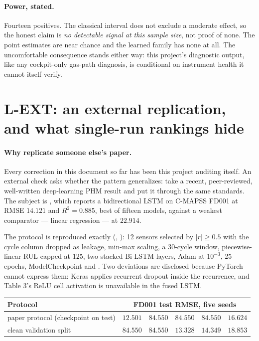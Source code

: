 \paragraph{Power, stated.} Fourteen positives. The classical interval does not exclude a
moderate effect, so the honest claim is \emph{no detectable signal at this sample size}, not
proof of none. The point estimates are near chance and the learned family has none at all. The
uncomfortable consequence stands either way: this project's diagnostic output, like any
cockpit-only gas-path diagnosis, is conditional on instrument health it cannot itself verify.

\section{L-EXT: an external replication, and what single-run rankings hide}
\label{sec:f14-ext}

\paragraph{Why replicate someone else's paper.} Every correction in this document so far has
been this project auditing itself. An external check asks whether the pattern generalizes:
take a recent, peer-reviewed, well-written deep-learning PHM result and put it through the same
standards. The subject is \textcite{mukherjee2026bilstm}, which reports a bidirectional LSTM on
C-MAPSS FD001 at RMSE $14.121$ and $R^2 = 0.885$, best of fifteen models, against a weakest
comparator --- linear regression --- at $22.914$.

The protocol is reproduced exactly (,
): 12 sensors selected by $|r| \ge 0.5$ with the cycle column dropped as
leakage, min-max scaling, a 30-cycle window, piecewise-linear RUL capped at 125, two stacked
Bi-LSTM layers, Adam at $10^{-3}$, 25 epochs, ModelCheckpoint and
. Two deviations are disclosed because PyTorch cannot
express them: Keras applies recurrent dropout inside the recurrence, and Table 3's ReLU cell
activation is unavailable in the fused LSTM.

\begin{center}\small
\begin{tabular}{@{}lrrrrr@{}}
  \toprule
  Protocol & \multicolumn{5}{c}{FD001 test RMSE, five seeds} \\
  \midrule
  paper protocol (checkpoint on test) & $12.501$ & $84.550$ & $84.550$ & $84.550$ & $16.624$ \\
  clean validation split              & $84.550$ & $84.550$ & $13.328$ & $14.349$ & $18.853$ \\
  \bottomrule
\end{tabular}
\end{center}

